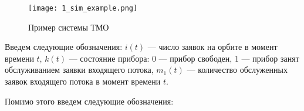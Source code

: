 \begin{figure}[H]
	\centering
	\texttt{[image: 1\_sim\_example.png]}
	\caption{Пример системы ТМО}
	\label{sys_tmo_example}
\end{figure}

Введем следующие обозначения: $i(t)$ --- число заявок на орбите в момент времени $t$, $k(t)$ --- состояние прибора: $0$ --- прибор свободен, $1$ --- прибор занят обслуживанием заявки входящего потока, $m_1(t)$ --- количество обслуженных заявок входящего потока в момент времени $t$.

Помимо этого введем следующие обозначения:
	
